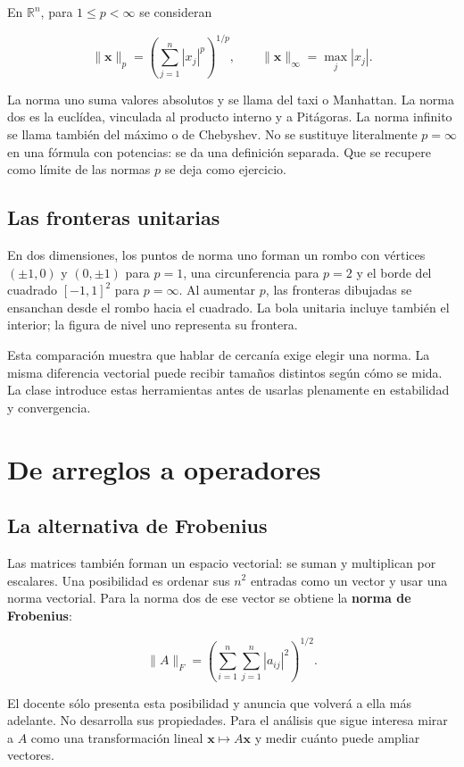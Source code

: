 \documentclass[12pt,a4paper]{article}
\begin{document}
En $\mathbb R^n$, para $1\le p<\infty$ se consideran

\[
\|\mathbf x\|_p=\left(\sum_{j=1}^n|x_j|^p\right)^{1/p},\qquad
\|\mathbf x\|_\infty=\max_j|x_j|.
\]

La norma uno suma valores absolutos y se llama del taxi o Manhattan. La norma dos es la euclídea, vinculada al producto interno y a Pitágoras. La norma infinito se llama también del máximo o de Chebyshev. No se sustituye literalmente $p=\infty$ en una fórmula con potencias: se da una definición separada. Que se recupere como límite de las normas $p$ se deja como ejercicio.

\subsection{Las fronteras unitarias}

En dos dimensiones, los puntos de norma uno forman un rombo con vértices $(\pm1,0)$ y $(0,\pm1)$ para $p=1$, una circunferencia para $p=2$ y el borde del cuadrado $[-1,1]^2$ para $p=\infty$. Al aumentar $p$, las fronteras dibujadas se ensanchan desde el rombo hacia el cuadrado. La bola unitaria incluye también el interior; la figura de nivel uno representa su frontera.


Esta comparación muestra que hablar de cercanía exige elegir una norma. La misma diferencia vectorial puede recibir tamaños distintos según cómo se mida. La clase introduce estas herramientas antes de usarlas plenamente en estabilidad y convergencia.

\section{De arreglos a operadores}

\subsection{La alternativa de Frobenius}

Las matrices también forman un espacio vectorial: se suman y multiplican por escalares. Una posibilidad es ordenar sus $n^2$ entradas como un vector y usar una norma vectorial. Para la norma dos de ese vector se obtiene la \textbf{norma de Frobenius}:

\[
\|A\|_F=\left(\sum_{i=1}^n\sum_{j=1}^n|a_{ij}|^2\right)^{1/2}.
\]

El docente sólo presenta esta posibilidad y anuncia que volverá a ella más adelante. No desarrolla sus propiedades. Para el análisis que sigue interesa mirar a $A$ como una transformación lineal $\mathbf x\mapsto A\mathbf x$ y medir cuánto puede ampliar vectores.
\end{document}
